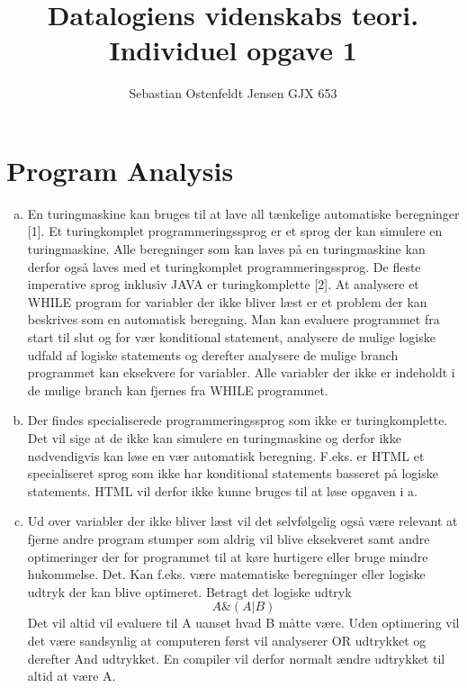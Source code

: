 \documentclass[12pt]{article}
\title{Datalogiens videnskabs teori. Individuel opgave 1}
\author{
		Sebastian Ostenfeldt Jensen
		GJX 653
		}
\begin{document}
 
\maketitle
\newpage
\section{Program Analysis}

\begin{enumerate}[(a)]

\item
En turingmaskine kan bruges til at lave all tænkelige automatiske beregninger
 [1]. Et turingkomplet programmeringssprog er et sprog der kan simulere en turingmaskine. 
 Alle beregninger som kan laves på en turingmaskine kan derfor også laves med et 
 turingkomplet programmeringssprog. De fleste imperative sprog inklusiv JAVA er turingkomplette 
 [2]. At analysere et WHILE program for variabler der ikke bliver læst er et problem der kan 
 beskrives som en automatisk beregning. Man kan evaluere programmet fra start til slut og for 
 vær konditional statement, analysere de mulige logiske udfald af logiske statements og derefter 
 analysere de mulige branch programmet kan eksekvere for variabler. Alle variabler der ikke er 
 indeholdt i de mulige branch kan fjernes fra WHILE programmet.

\item
Der findes specialiserede programmeringssprog som ikke er turingkomplette. Det 
vil sige at de ikke kan simulere en turingmaskine og derfor ikke nødvendigvis
kan løse en vær automatisk beregning. F.eks. er HTML et specialiseret sprog
som ikke har konditional statements basseret på logiske statements. HTML vil
derfor ikke kunne bruges til at løse opgaven i a. 
\item
Ud over variabler der ikke bliver læst vil det selvfølgelig også være relevant at fjerne andre 
program stumper som aldrig vil blive eksekveret samt andre optimeringer der for
programmet til at køre hurtigere eller bruge mindre hukommelse. Det. Kan f.eks. være matematiske beregninger 
eller logiske udtryk der kan blive optimeret. Betragt det logiske udtryk
$$A \& (A | B) $$
Det vil altid vil evaluere til A uanset hvad B måtte være. Uden optimering vil
det være sandsynlig at computeren først vil analyserer OR udtrykket og derefter And udtrykket. En compiler vil derfor normalt ændre udtrykket 
til altid at være A.
\end{enumerate}
\end{document}
